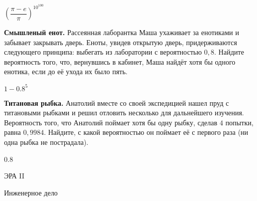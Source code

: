 \documentclass[12pt, addpoints]{exam} %
\begin{document}
\begin{questions}
\begin{solution}
$\left(\dfrac{\pi-e}{\pi}\right)^{10^{100}}$
\end{solution}

\question \textbf{Смышленый енот.} Рассеянная лаборантка Маша  ухаживает за енотиками и забывает закрывать дверь. Еноты, увидев открытую дверь,  придерживаются следующего принципа: выбегать из лаборатории с вероятностью $0,8$. Найдите вероятность того, что, вернувшись в кабинет, Маша найдёт хотя бы одного енотика, если до её ухода их было пять.

\begin{solution}
$1-0.8^5$
\end{solution}

\question \textbf{Титановая рыбка.} Анатолий вместе со своей экспедицией нашел пруд с титановыми рыбками и решил отловить несколько для дальнейшего изучения. Вероятность того, что Анатолий поймает хотя бы одну рыбку, сделав $4$ попытки, равна $0,9984$. Найдите, с какой вероятностью он поймает её с первого раза (ни одна рыбка не пострадала).
\begin{solution}
0.8
\end{solution}


\end{questions}



\newpage
\begin{center}
ЭРА II
\end{center}

\begin{center}
Инженерное дело
\end{center}
\end{document}
